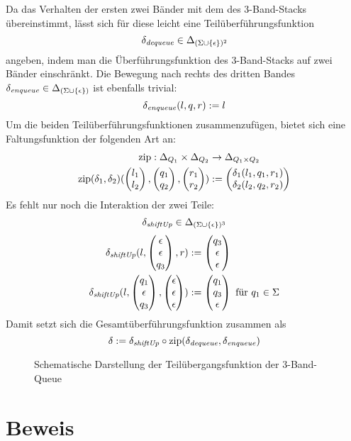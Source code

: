 \documentclass{article}
\DeclareMathOperator{\zip}{zip}
\begin{document}
Da das Verhalten der ersten zwei Bänder mit dem des 3-Band-Stacks übereinstimmt, lässt sich für diese leicht eine Teilüberführungsfunktion
\[ \delta_\mathit{dequeue} \in \Delta_{(\Sigma \cup \{\epsilon\})^2} \]
angeben, indem man die Überführungsfunktion des 3-Band-Stacks auf zwei Bänder einschränkt.  Die Bewegung nach rechts des dritten Bandes $\delta_\mathit{enqueue} \in \Delta_{(\Sigma \cup \{\epsilon\})}$ ist ebenfalls trivial:
\[ \delta_\mathit{enqueue}(l,q,r) := l \]
Um die beiden Teilüberführungsfunktionen zusammenzufügen, bietet sich eine Faltungsfunktion der folgenden Art an:
\begin{align*}
    \zip : \Delta_{Q_1} \times \Delta_{Q_2} &\rightarrow \Delta_{Q_1 \times Q_2} \\
    \zip(\delta_1, \delta_2)(\vet{l_1}{l_2},\vet{q_1}{q_2},\vet{r_1}{r_2}) &:= \vet{\delta_1(l_1,q_1,r_1)}{\delta_2(l_2,q_2,r_2)}
\end{align*}
Es fehlt nur noch die Interaktion der zwei Teile:
\[ \delta_\mathit{shiftUp} \in \Delta_{(\Sigma \cup \{\epsilon\})^3} \]
\begin{align*}
    \delta_\mathit{shiftUp}(l,\begin{pmatrix}\epsilon\\\epsilon\\q_3\end{pmatrix},r) &:= \begin{pmatrix}q_3\\\epsilon\\\epsilon\end{pmatrix} \\
    \delta_\mathit{shiftUp}(l,\begin{pmatrix}q_1\\\epsilon\\q_3\end{pmatrix},\begin{pmatrix}\epsilon\\\epsilon\\\epsilon\end{pmatrix}) &:= \begin{pmatrix}q_1\\q_3\\\epsilon\end{pmatrix} \text{ für } q_1 \in \Sigma
\end{align*}
Damit setzt sich die Gesamtüberführungsfunktion zusammen als
\[ \delta := \delta_\shiftUp \circ \zip(\delta_\dequeue,\delta_\enqueue) \]
\begin{figure}[h]
    \centering
    \caption{Schematische Darstellung der Teilübergangsfunktion der 3-Band-Queue}
\end{figure}

\section{Beweis}
\end{document}
